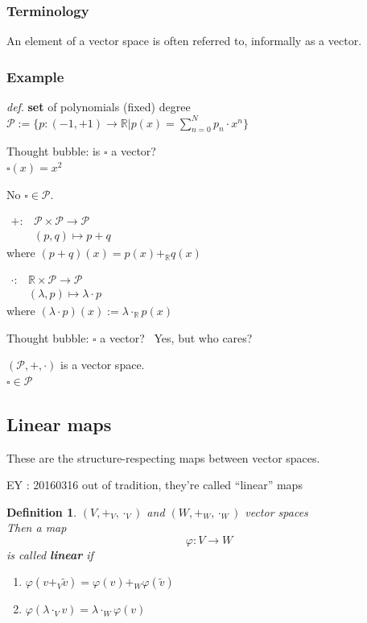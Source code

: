 \documentclass[10pt]{amsart}
\newtheorem{definition}{Definition}
\begin{document}
\begin{multicols*}{2}
\subsubsection*{Terminology} An element of a vector space is often referred to, informally as a vector.  

\subsubsection*{Example}
\emph{def}. \textbf{set} of polynomials (fixed) degree $\mathcal{P} := \lbrace p :(-1,+1) \to \mathbb{R} | p(x) = \sum_{n=0}^N p_n \cdot x^n \rbrace$

Thought bubble: is $\square $ a vector?  \\
\phantom{Thought bubble}$\square(x) = x^2$

No $\square \in \mathcal{P}$.

$\begin{aligned} +:  & \mathcal{P} \times \mathcal{P} \to \mathcal{P} \\
& (p,q) \mapsto p+q \end{aligned}$  \\
where $(p+q)(x) = p(x) +_{\mathbb{R}} q(x)$

$\begin{aligned} 
\cdot : & \mathbb{R} \times \mathcal{P} \to \mathcal{P} \\
& (\lambda, p) \mapsto \lambda \cdot p \end{aligned}$ \\
where $(\lambda \cdot p)(x) := \lambda \cdot_{\mathbb{R}} p(x)$

Thought bubble: $\square$ a vector?  \qquad \, Yes, but who cares?

$(\mathcal{P}, + ,\cdot )$ is a vector space.   \\
$\square \in \mathcal{P}$

\subsection{Linear maps}

These are the structure-respecting maps between vector spaces.  

EY : 20160316 out of tradition, they're called ``linear'' maps

\begin{definition}
	$(V,+_V,\cdot_V)$ and $(W,+_W,\cdot_W)$ vector spaces \\
	Then a map
	\[
	\varphi : V \to W 
	\]
	is called \textbf{linear} if 
	\begin{enumerate}
		\item[(i)] $\varphi(v+_V \widetilde{v}) = \varphi(v) +_W \varphi(\widetilde{v}) $  
		\item[(ii)] $\varphi(\lambda \cdot_V v) = \lambda \cdot_W \varphi(v)$
	\end{enumerate}
\end{definition}


\end{multicols*}
\end{document}
